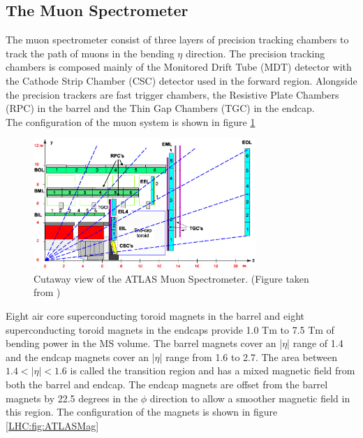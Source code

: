 \subsection{The Muon Spectrometer}
\label{LHC:MuonSpec}

\indent The muon spectrometer consist of three layers of precision tracking chambers to track the path of muons in the bending $\eta$ direction.  The precision tracking chambers is composed mainly of the Monitored Drift Tube (MDT) detector with the Cathode Strip Chamber (CSC) detector used in the forward region.  Alongside the precision trackers are fast trigger chambers, the Resistive Plate Chambers (RPC) in the barrel and the Thin Gap Chambers (TGC) in the endcap. \\

\indent The configuration of the muon system is shown in figure \ref{LHC:fig:ATLASMuonSpec} ~\\

\begin{figure}[h!]
\centering
\includegraphics[width=0.75\textwidth, angle=0]{figures/LHC_ATLAS/Muon_rz_large_sect_6.eps}
\caption{ Cutaway view of the ATLAS Muon Spectrometer.  (Figure taken from \cite{ATLAS_JINST}) \label{LHC:fig:ATLASMuonSpec}}
\end{figure}

\indent Eight air core superconducting toroid magnets in the barrel and eight superconducting toroid magnets in the endcaps provide 1.0 Tm to 7.5 Tm of bending power in the MS volume. The barrel magnets cover an |$\eta$| range of 1.4 and the endcap magnets cover an |$\eta$| range from 1.6 to 2.7. The area between $1.4 < |\eta| < 1.6$ is called the transition region and has a mixed magnetic field from both the barrel and endcap. The endcap magnets are offset from the barrel magnets by 22.5 degrees in the $\phi$ direction to allow a smoother magnetic field in this region. The configuration of the magnets is shown in figure \ref{LHC:fig:ATLASMag} ~\\

